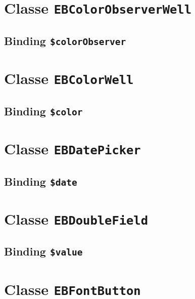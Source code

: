 \section{Classe \texttt{EBColorObserverWell}}

\subsection{Binding \texttt{\$colorObserver}}








\section{Classe \texttt{EBColorWell}}

\subsection{Binding \texttt{\$color}}








\section{Classe \texttt{EBDatePicker}}

\subsection{Binding \texttt{\$date}}








\section{Classe \texttt{EBDoubleField}}

\subsection{Binding \texttt{\$value}}








\section{Classe \texttt{EBFontButton}}

